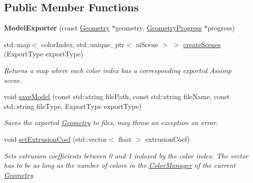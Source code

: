 \subsection*{Public Member Functions}
\begin{DoxyCompactItemize}
\item 
\mbox{\label{classpepr3d_1_1_model_exporter_a90cdfb31200413255c75cc2af4c55952}} 
{\bfseries Model\+Exporter} (const \mbox{\hyperlink{classpepr3d_1_1_geometry}{Geometry}} $\ast$geometry, \mbox{\hyperlink{structpepr3d_1_1_geometry_progress}{Geometry\+Progress}} $\ast$progress)
\item 
\mbox{\label{classpepr3d_1_1_model_exporter_a4fd1351a4fb5634b761f1693206e0a1d}} 
std\+::map$<$ color\+Index, std\+::unique\+\_\+ptr$<$ ai\+Scene $>$ $>$ \mbox{\hyperlink{classpepr3d_1_1_model_exporter_a4fd1351a4fb5634b761f1693206e0a1d}{create\+Scenes}} (Export\+Type export\+Type)
\begin{DoxyCompactList}\small\item\em Returns a map where each color index has a corresponding exported Assimp scene. \end{DoxyCompactList}\item 
\mbox{\label{classpepr3d_1_1_model_exporter_a0521b274720d0ad6beeaae466718fa45}} 
void \mbox{\hyperlink{classpepr3d_1_1_model_exporter_a0521b274720d0ad6beeaae466718fa45}{save\+Model}} (const std\+::string file\+Path, const std\+::string file\+Name, const std\+::string file\+Type, Export\+Type export\+Type)
\begin{DoxyCompactList}\small\item\em Saves the exported \mbox{\hyperlink{classpepr3d_1_1_geometry}{Geometry}} to files, may throw an exception on error. \end{DoxyCompactList}\item 
\mbox{\label{classpepr3d_1_1_model_exporter_a395f37149485a267944542b378546f6e}} 
void \mbox{\hyperlink{classpepr3d_1_1_model_exporter_a395f37149485a267944542b378546f6e}{set\+Extrusion\+Coef}} (std\+::vector$<$ float $>$ extrusion\+Coef)
\begin{DoxyCompactList}\small\item\em Sets extrusion coefficients between 0 and 1 indexed by the color index. The vector has to be as long as the number of colors in the \mbox{\hyperlink{classpepr3d_1_1_color_manager}{Color\+Manager}} of the current \mbox{\hyperlink{classpepr3d_1_1_geometry}{Geometry}}. \end{DoxyCompactList}\end{DoxyCompactItemize}
